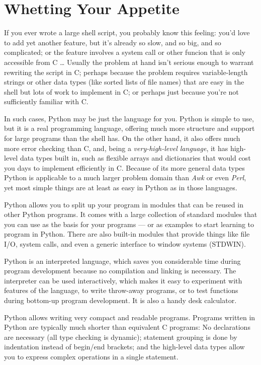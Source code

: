 
\section{Whetting Your Appetite}

If you ever wrote a large shell script, you probably know this feeling:
you'd love to add yet another feature, but it's already so slow, and so
big, and so complicated; or the feature involves a system call or other
funcion that is only accessible from C \ldots
Usually the problem at hand isn't serious enough to warrant rewriting
the script in C; perhaps because the problem requires variable-length
strings or other data types (like sorted lists of file names) that
are easy in the shell but lots of work to implement in C; or perhaps
just because you're not sufficiently familiar with C.

In such cases, Python may be just the language for you.
Python is simple to use, but it is a real programming language, offering
much more structure and support for large programs than the shell has.
On the other hand, it also offers much more error checking than C, and,
being a
{\em very-high-level language},
it has high-level data types built in, such as flexible arrays and
dictionaries that would cost you days to implement efficiently in C.
Because of its more general data types Python is applicable to a
much larger problem domain than
{\em Awk}
or even
{\em Perl},
yet most simple things are at least as easy in Python as in those
languages.

Python allows you to split up your program in modules that can be reused
in other Python programs.
It comes with a large collection of standard modules that you can use as
the basis for your programs --- or as examples to start learning to
program in Python.
There are also built-in modules that provide things like file I/O,
system calls, and even a generic interface to window systems (STDWIN).

Python is an interpreted language, which saves you considerable time
during program development because no compilation and linking is
necessary.
The interpreter can be used interactively, which makes it easy to
experiment with features of the language, to write throw-away programs,
or to test functions during bottom-up program development.
It is also a handy desk calculator.

Python allows writing very compact and readable programs.
Programs written in Python are typically much shorter than equivalent C
programs:
No declarations are necessary (all type checking is
dynamic); statement grouping is done by indentation instead of begin/end
brackets; and the high-level data types allow you to express complex
operations in a single statement.

